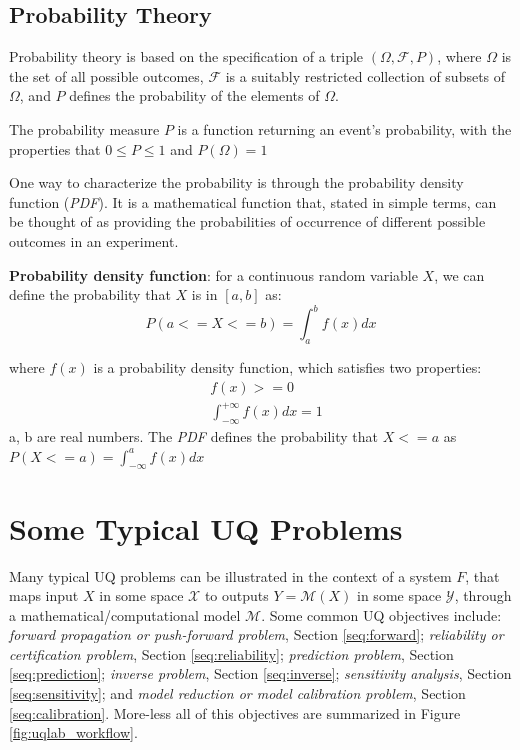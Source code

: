 \subsection{Probability Theory}
Probability theory is based on the specification of a triple $(\Omega,\mathcal{F},P)$, where $\Omega$ is the set of all possible outcomes, $\mathcal{F}$  is a suitably restricted collection of subsets of $\Omega$, and $P$ defines the probability of the elements of $\Omega$.

The probability measure $P$ is a function returning an event's probability, with the properties that $0 \leq P \leq 1$ and $P(\Omega)=1$

One way to characterize the probability is through the probability density function (\textit{PDF}). It is a mathematical function that, stated in simple terms, can be thought of as providing the probabilities of occurrence of different possible outcomes in an experiment. 

\textbf{Probability density function}: for a continuous random variable $X$, we can define the probability that $X$ is in $[a,b]$ as:
\begin{equation}
P(a<=X<=b)=\int_a^b f(x)dx
\end{equation}

where $f(x)$ is a probability density function, which satisfies two properties:
\begin{equation*}
\begin{aligned}
& f(x)>=0 \\ 
& \int_{-\infty}^{+\infty}f(x) dx =1
\end{aligned}
\end{equation*}
a, b are real numbers.
The \textit{PDF} defines the probability that $X<=a$ as
$P(X<=a)=\int_{-\infty}^a f(x) dx$

\section{Some Typical UQ Problems}\label{sec:uq_problems}
Many typical UQ problems can be illustrated in the context of a system $F$, that maps input $X$ in some space $\mathcal{X}$ to outputs $Y = \mathcal{M}(X)$ in some space $\mathcal{Y}$, through a mathematical/computational model $\mathcal{M}$. Some common UQ objectives include: \textit{forward propagation or push-forward problem}, Section \ref{seq:forward}; \textit{reliability or certification problem}, Section \ref{seq:reliability}; \textit{prediction problem}, Section \ref{seq:prediction}; \textit{inverse problem}, Section \ref{seq:inverse}; \textit{sensitivity analysis}, Section \ref{seq:sensitivity}; and \textit{model reduction or model calibration problem}, Section \ref{seq:calibration}. More-less all of this objectives are summarized in Figure \ref{fig:uqlab_workflow}.

